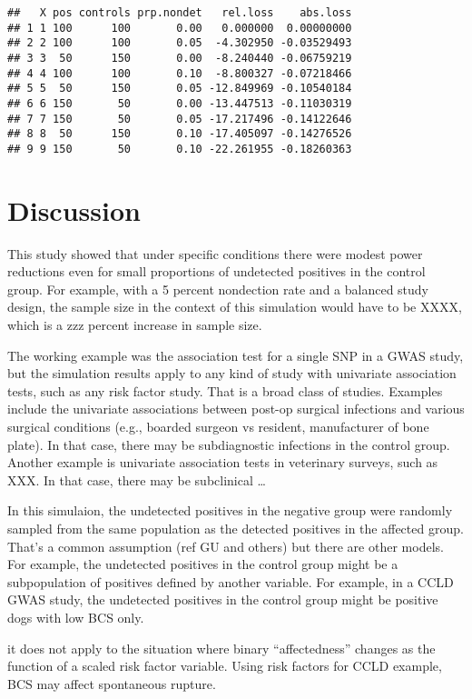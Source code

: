 \documentclass[
]{article}
\begin{document}
\begin{verbatim}
##   X pos controls prp.nondet   rel.loss    abs.loss
## 1 1 100      100       0.00   0.000000  0.00000000
## 2 2 100      100       0.05  -4.302950 -0.03529493
## 3 3  50      150       0.00  -8.240440 -0.06759219
## 4 4 100      100       0.10  -8.800327 -0.07218466
## 5 5  50      150       0.05 -12.849969 -0.10540184
## 6 6 150       50       0.00 -13.447513 -0.11030319
## 7 7 150       50       0.05 -17.217496 -0.14122646
## 8 8  50      150       0.10 -17.405097 -0.14276526
## 9 9 150       50       0.10 -22.261955 -0.18260363
\end{verbatim}

\hypertarget{discussion}{%
\section{Discussion}\label{discussion}}

This study showed that under specific conditions there were modest power
reductions even for small proportions of undetected positives in the
control group. For example, with a 5 percent nondection rate and a
balanced study design, the sample size in the context of this simulation
would have to be XXXX, which is a zzz percent increase in sample size.

The working example was the association test for a single SNP in a GWAS
study, but the simulation results apply to any kind of study with
univariate association tests, such as any risk factor study. That is a
broad class of studies. Examples include the univariate associations
between post-op surgical infections and various surgical conditions
(e.g., boarded surgeon vs resident, manufacturer of bone plate). In that
case, there may be subdiagnostic infections in the control group.
Another example is univariate association tests in veterinary surveys,
such as XXX. In that case, there may be subclinical \ldots{}

In this simulaion, the undetected positives in the negative group were
randomly sampled from the same population as the detected positives in
the affected group. That's a common assumption (ref GU and others) but
there are other models. For example, the undetected positives in the
control group might be a subpopulation of positives defined by another
variable. For example, in a CCLD GWAS study, the undetected positives in
the control group might be positive dogs with low BCS only.

it does not apply to the situation where binary ``affectedness'' changes
as the function of a scaled risk factor variable. Using risk factors for
CCLD example, BCS may affect spontaneous rupture.
\end{document}
